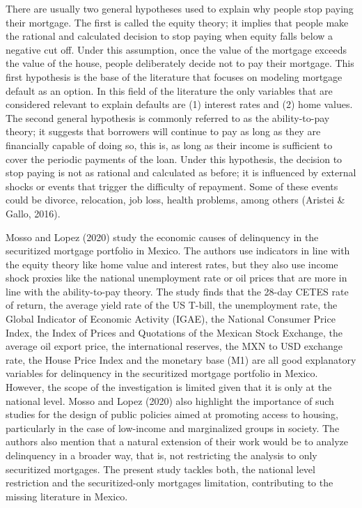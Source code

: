 \documentclass[
]{article}
\begin{document}
There are usually two general hypotheses used to explain why people stop
paying their mortgage. The first is called the equity theory; it implies
that people make the rational and calculated decision to stop paying
when equity falls below a negative cut off. Under this assumption, once
the value of the mortgage exceeds the value of the house, people
deliberately decide not to pay their mortgage. This first hypothesis is
the base of the literature that focuses on modeling mortgage default as
an option. In this field of the literature the only variables that are
considered relevant to explain defaults are (1) interest rates and (2)
home values. The second general hypothesis is commonly referred to as
the ability-to-pay theory; it suggests that borrowers will continue to
pay as long as they are financially capable of doing so, this is, as
long as their income is sufficient to cover the periodic payments of the
loan. Under this hypothesis, the decision to stop paying is not as
rational and calculated as before; it is influenced by external shocks
or events that trigger the difficulty of repayment. Some of these events
could be divorce, relocation, job loss, health problems, among others
(Aristei \& Gallo, 2016).

Mosso and Lopez (2020) study the economic causes of delinquency in the
securitized mortgage portfolio in Mexico. The authors use indicators in
line with the equity theory like home value and interest rates, but they
also use income shock proxies like the national unemployment rate or oil
prices that are more in line with the ability-to-pay theory. The study
finds that the 28-day CETES rate of return, the average yield rate of
the US T-bill, the unemployment rate, the Global Indicator of Economic
Activity (IGAE), the National Consumer Price Index, the Index of Prices
and Quotations of the Mexican Stock Exchange, the average oil export
price, the international reserves, the MXN to USD exchange rate, the
House Price Index and the monetary base (M1) are all good explanatory
variables for delinquency in the securitized mortgage portfolio in
Mexico. However, the scope of the investigation is limited given that it
is only at the national level. Mosso and Lopez (2020) also highlight the
importance of such studies for the design of public policies aimed at
promoting access to housing, particularly in the case of low-income and
marginalized groups in society. The authors also mention that a natural
extension of their work would be to analyze delinquency in a broader
way, that is, not restricting the analysis to only securitized
mortgages. The present study tackles both, the national level
restriction and the securitized-only mortgages limitation, contributing
to the missing literature in Mexico.
\end{document}
